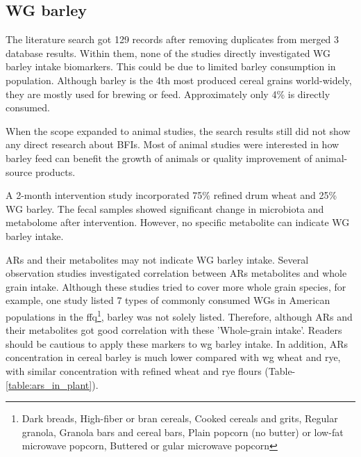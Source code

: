 \subsection{WG barley}
The literature search got 129 records after removing duplicates from merged 3 database results. Within them, none of the studies directly investigated WG barley intake biomarkers. This could be due to limited barley consumption in population. Although barley is the 4th most produced cereal grains world-widely, they are mostly used for brewing or feed. Approximately only 4\% is directly consumed\cite{Baik2008}.

When the scope expanded to animal studies, the search results still did not show any direct research about BFIs. Most of animal studies were interested in how barley feed can benefit the growth of animals or quality improvement of animal-source products\cite{ISI:000272990200002,Foster2003}.

A 2-month intervention study\cite{DeAngelis2015} incorporated 75\% refined drum wheat and 25\% WG barley. The fecal samples showed significant change in microbiota and metabolome after intervention\cite{DeAngelis2015}. However, no specific metabolite can indicate WG barley intake.

ARs and their metabolites may not indicate WG barley intake. Several observation studies\cite{ISI:000309032000011,ISI:000259554500019} investigated correlation between ARs metabolites and whole grain intake. Although these studies tried to cover more whole grain species, for example, one study\cite{ISI:000259554500019} listed 7 types of commonly consumed WGs in American populations in the \acrfull{ffq}\footnote{Dark breads, High-fiber or bran cereals, Cooked cereals and grits, Regular granola, Granola bars and cereal bars, Plain popcorn (no butter) or low-fat microwave popcorn, Buttered or gular microwave popcorn}, barley was not solely listed. Therefore, although ARs and their metabolites got good correlation with these 'Whole-grain intake'. Readers should be cautious to apply these markers to \acrshort{wg} barley intake. 
In addition, ARs concentration in cereal barley is much lower compared with \acrshort{wg} wheat and rye, with similar concentration with refined wheat and rye flours (Table-\ref{table:ars_in_plant}). 


